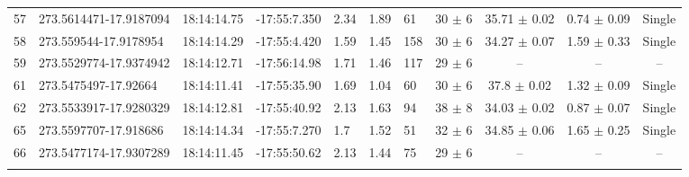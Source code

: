 \begin{table}[htbp!]
\begin{tabular}{llllllllccc}
57  &  273.5614471-17.9187094  &  18:14:14.75  &  -17:55:7.350  &  2.34  &  1.89  &  61  &  30 $\pm$ 6  &  35.71 $\pm$ 0.02  &  0.74 $\pm$ 0.09  &  Single \\
58  &  273.559544-17.9178954  &  18:14:14.29  &  -17:55:4.420  &  1.59  &  1.45  &  158  &  30 $\pm$ 6  &  34.27 $\pm$ 0.07  &  1.59 $\pm$ 0.33  &  Single \\
59  &  273.5529774-17.9374942  &  18:14:12.71  &  -17:56:14.98  &  1.71  &  1.46  &  117  &  29 $\pm$ 6  &  --  &  --  &  -- \\
61  &  273.5475497-17.92664  &  18:14:11.41  &  -17:55:35.90  &  1.69  &  1.04  &  60  &  30 $\pm$ 6  &  37.8 $\pm$ 0.02  &  1.32 $\pm$ 0.09  &  Single \\
62  &  273.5533917-17.9280329  &  18:14:12.81  &  -17:55:40.92  &  2.13  &  1.63  &  94  &  38 $\pm$ 8  &  34.03 $\pm$ 0.02  &  0.87 $\pm$ 0.07  &  Single \\
65  &  273.5597707-17.918686  &  18:14:14.34  &  -17:55:7.270  &  1.7  &  1.52  &  51  &  32 $\pm$ 6  &  34.85 $\pm$ 0.06  &  1.65 $\pm$ 0.25  &  Single \\
66  &  273.5477174-17.9307289  &  18:14:11.45  &  -17:55:50.62  &  2.13  &  1.44  &  75  &  29 $\pm$ 6  &  --  &  --  &  -- \\
\hline \noalign {\smallskip}
\end{tabular}
\end{table}


